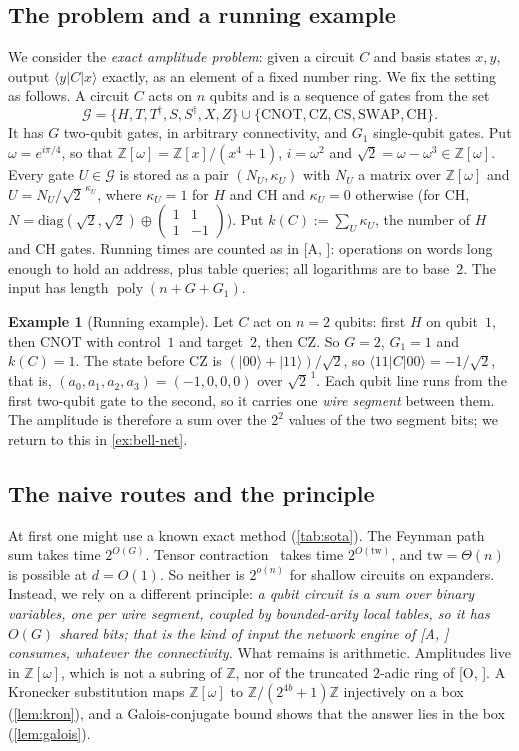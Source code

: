 \documentclass[10pt]{amsart}
\theoremstyle{plain}
\theoremstyle{definition}
\newtheorem{example}{Example}
\theoremstyle{remark}
\numberwithin{equation}{section}
\newcommand{\Z}{\mathbb{Z}}
\newcommand{\Zw}{\Z[\omega]}
\newcommand{\poly}{\operatorname{poly}}
\newcommand{\cG}{\mathcal{G}}
\newcommand{\ket}[1]{|#1\rangle}
\newcommand{\amp}[3]{\langle #1|#2|#3\rangle}
\newcommand{\A}[1][]{\textup{[A\if\relax\detokenize{#1}\relax\else, #1\fi]}}
\newcommand{\Oa}[1][]{\textup{[O\if\relax\detokenize{#1}\relax\else, #1\fi]}}
\begin{document}
\subsection{The problem and a running example}
We consider the \emph{exact amplitude problem}: given a circuit $C$ and basis states $x,y$, output
$\amp{y}{C}{x}$ exactly, as an element of a fixed number ring. We fix the setting as follows.
A circuit $C$ acts on $n$ qubits and is a sequence of gates from the set
\[
  \cG=\{H,T,T^\dagger,S,S^\dagger,X,Z\}\cup\{\mathrm{CNOT},\mathrm{CZ},\mathrm{CS},\mathrm{SWAP},\mathrm{CH}\}.
\]
It has $G$ two-qubit gates, in arbitrary connectivity, and $G_1$ single-qubit gates. Put
$\omega=e^{i\pi/4}$, so that $\Zw=\Z[x]/(x^4+1)$, $i=\omega^2$ and $\sqrt2=\omega-\omega^3\in\Zw$.
Every gate $U\in\cG$ is stored as a pair $(N_U,\kappa_U)$ with $N_U$ a matrix over $\Zw$ and
$U=N_U/\sqrt2^{\,\kappa_U}$, where $\kappa_U=1$ for $H$ and $\mathrm{CH}$ and $\kappa_U=0$
otherwise (for $\mathrm{CH}$, $N=\mathrm{diag}(\sqrt2,\sqrt2)\oplus\left(\begin{smallmatrix}1&1\\1&-1\end{smallmatrix}\right)$). Put
$k(C):=\sum_U\kappa_U$, the number of $H$ and $\mathrm{CH}$ gates. Running times are counted as in
\A: operations on words long enough to hold an address, plus table queries; all logarithms are to
base~$2$. The input has length $\poly(n+G+G_1)$.

\begin{example}[Running example]\label{ex:bell}
Let $C$ act on $n=2$ qubits: first $H$ on qubit~$1$, then $\mathrm{CNOT}$ with control~$1$ and
target~$2$, then $\mathrm{CZ}$. So $G=2$, $G_1=1$ and $k(C)=1$. The state before $\mathrm{CZ}$ is
$(\ket{00}+\ket{11})/\sqrt2$, so $\amp{11}{C}{00}=-1/\sqrt2$, that is, $(a_0,a_1,a_2,a_3)=(-1,0,0,0)$
over $\sqrt2^{\,1}$. Each qubit line runs from the first two-qubit gate to the second, so it carries
one \emph{wire segment} between them. The amplitude is therefore a sum over the $2^2$ values of the
two segment bits; we return to this in \cref{ex:bell-net}.
\end{example}

\subsection{The naive routes and the principle}
At first one might use a known exact method (\cref{tab:sota}). The Feynman path sum takes time
$2^{O(G)}$. Tensor contraction~\cite{MarkovShi08} takes time $2^{O(\mathrm{tw})}$, and
$\mathrm{tw}=\Theta(n)$ is possible at $d=O(1)$. So neither is $2^{o(n)}$ for shallow circuits on
expanders. Instead, we rely on a different principle: \emph{a qubit circuit is a sum over binary
variables, one per wire segment, coupled by bounded-arity local tables, so it has $O(G)$ shared bits;
that is the kind of input the network engine of \A{} consumes, whatever the connectivity.} What
remains is arithmetic. Amplitudes live in $\Zw$, which is not a subring of $\Z$, nor of the
truncated $2$-adic ring of \Oa. A Kronecker substitution maps $\Zw$ to $\Z/(2^{4b}+1)\Z$
injectively on a box (\cref{lem:kron}), and a Galois-conjugate bound shows that the answer lies in
the box (\cref{lem:galois}).
\end{document}
